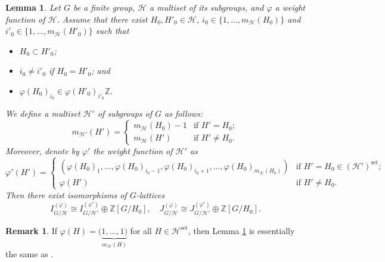 \documentclass[12pt]{amsart}
\theoremstyle{plain}
\newtheorem{lem}[thm]{Lemma}
\theoremstyle{definition}
\newtheorem{rem}[thm]{Remark}
\numberwithin{thm}{section}
\numberwithin{equation}{section}
\newcommand{\Z}{\mathbb{Z}}
\newcommand{\cH}{\mathcal{H}}
\DeclareMathOperator{\set}{set}
\begin{document}
\begin{lem}\label{lem:rded}
Let $G$ be a finite group, $\cH$ a multiset of its subgroups, and $\varphi$ a weight function of $\cH$. Assume that there exist $H_{0},H'_{0}\in \cH$, $i_{0}\in \{1,\ldots,m_{\cH}(H_{0})\}$ and $i'_{0}\in \{1,\ldots,m_{\cH}(H'_{0})\}$ such that
\begin{itemize}
\item $H_{0}\subset H'_{0}$; 
\item $i_{0}\neq i'_{0}$ if $H_{0}=H'_{0}$; and
\item ${\varphi}(H_{0})_{i_{0}}\in {\varphi}(H'_{0})_{i'_{0}}\Z$.
\end{itemize}
We define a multiset $\cH'$ of subgroups of $G$ as follows: 
\begin{equation*}
m_{\cH'}(H')=
\begin{cases}
    m_{\cH}(H_{0})-1&\text{if }H'=H_{0};\\
    m_{\cH}(H')&\text{if }H'\neq H_{0}. 
\end{cases}
\end{equation*}
Moreover, denote by $\varphi'$ the weight function of $\cH'$ as 
\begin{equation*}
\varphi'(H')=
\begin{cases}
    (\varphi(H_{0})_{1},\ldots,\varphi(H_{0})_{i_{0}-1},\varphi(H_{0})_{i_{0}+1},\ldots,\varphi(H_{0})_{m_{\cH}(H_{0})})&\text{if }H'=H_{0}\in (\cH')^{\set};\\
    \varphi(H')&\text{if }H'\neq H_0. 
\end{cases}
\end{equation*}
Then there exist isomorphisms of $G$-lattices
\begin{equation*}
I_{G/\cH}^{(\varphi)} \cong I_{G/\cH'}^{({\varphi'})} \oplus \Z[G/H_{0}],\quad
J_{G/\cH}^{(\varphi)} \cong J_{G/\cH'}^{({\varphi'})} \oplus \Z[G/H_{0}]. 
\end{equation*}
\end{lem}

\begin{rem}
If $\varphi(H)=(\underbrace{1,\ldots,1)}_{m_{\cH}(H)}$ for all $H\in \cH^{\set}$, then Lemma \ref{lem:rded} is essentially the same as \cite[Proposition 1.3]{Endo2011}. 
\end{rem}
\end{document}
